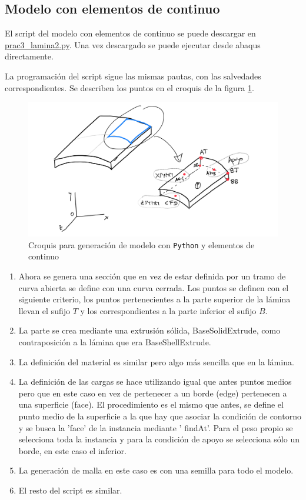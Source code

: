 \documentclass[spanish,a4paper,12pt]{article}
\begin{document}
\subsection{Modelo con elementos de continuo}

El script del modelo con elementos de continuo se puede descargar en \href{http://stokes.mecanica.upm.es/MCIC_open/practicas/scripts-python/prac3_lamina2.py}{\ttfamily prac3\_lamina2.py}. 
Una vez descargado se puede ejecutar desde abaqus directamente.

La programación del script sigue las mismas pautas, con las salvedades correspondientes. 
Se describen los puntos en el croquis de la figura \ref{fig:lamina2}.
\begin{figure}
\centering
	\includegraphics[scale=0.25]{figs/prac3_lamina2_fig.png}
	\caption{Croquis para generación de modelo con \texttt{Python} y elementos de continuo}
	\label{fig:lamina2}
\end{figure}
\begin{enumerate}
\item
Ahora se genera una sección que en vez de estar definida por un 
tramo de curva abierta se define con una curva cerrada.
Los puntos se definen con el siguiente criterio, los puntos pertenecientes a la parte superior de la lámina llevan el sufijo $T$ y los correspondientes
a la parte inferior el sufijo $B$.
\item
La parte se crea mediante una extrusión sólida, BaseSolidExtrude, como contraposición a la lámina que era  BaseShellExtrude.
\item
La definición del material es similar pero algo más sencilla que en la lámina.
\item
La definición de las cargas se hace utilizando igual que antes puntos medios pero que en este caso en vez de pertenecer a un borde (edge) pertenecen a una 
superficie (face). El procedimiento es el mismo que antes, se define el punto medio de la superficie a la que hay que asociar la condición de contorno y se 
busca la 'face' de la instancia mediante ' findAt'.
Para el peso propio se selecciona toda la instancia y para la condición de apoyo se selecciona sólo un borde, en este caso el inferior.
\item
La generación de malla en este caso es con una semilla para todo el modelo.
\item
El resto del script es similar.
\end{enumerate}
\end{document}
